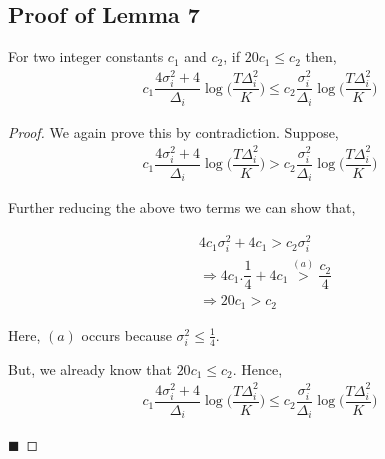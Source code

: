 \subsection{Proof of Lemma 7}
\label{App:Lemma:7}
\begin{lemma}
For two integer constants $c_1$ and $c_2$, if $20 c_1 \leq c_2$ then,
\begin{align*}
c_1 \dfrac{4\sigma_i^2 + 4}{\Delta_i}\log\bigg( \dfrac{T\Delta_i^2}{K}\bigg) \leq c_2 \dfrac{\sigma_i^2}{\Delta_i}\log\bigg( \dfrac{T\Delta_i^2}{K}\bigg)
\end{align*}
 
\end{lemma}

\begin{proof}
We again prove this by contradiction. Suppose, 
\begin{align*}
c_1 \dfrac{4\sigma_i^2 + 4}{\Delta_i}\log\bigg( \dfrac{T\Delta_i^2}{K}\bigg) > c_2 \dfrac{\sigma_i^2}{\Delta_i}\log\bigg( \dfrac{T\Delta_i^2}{K}\bigg)
\end{align*}

Further reducing the above two terms we can show that, 

\begin{align*}
& 4c_1\sigma_i^2 + 4c_1 > c_2\sigma_i^2\\
& \Rightarrow 4c_1.\dfrac{1}{4} + 4c_1 \overset{(a)}{>} \dfrac{c_2}{4}\\
& \Rightarrow 20 c_1 > c_2
\end{align*}

Here, $(a)$ occurs because $\sigma_i^2 \leq \frac{1}{4}$.

But, we already know that $20 c_1 \leq c_2$. Hence, 
\begin{align*}
c_1 \dfrac{4\sigma_i^2 + 4}{\Delta_i}\log\bigg( \dfrac{T\Delta_i^2}{K}\bigg) \leq c_2 \dfrac{\sigma_i^2}{\Delta_i}\log\bigg( \dfrac{T\Delta_i^2}{K}\bigg)
\end{align*}

\hfill $\blacksquare$	
\end{proof}

